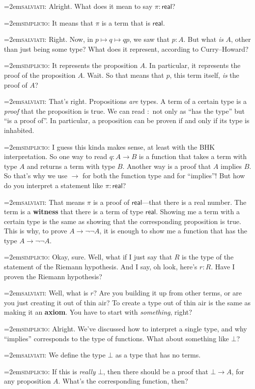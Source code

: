 \documentclass[11pt,paper=letter]{scrartcl}
\renewcommand{\sf}{\mathsf}
\renewcommand{\lnot}{\neg}
\newcommand{\false}{\bot}
\newcommand{\simp}{\vspace{0.5em}\noindent\hangindent=2em\textsc{simplicio:} }
\newcommand{\salv}{\vspace{0.5em}\noindent\hangindent=2em\textsc{salviati:} }
\begin{document}
\salv Alright. What does it mean to say $\pi : \sf{real}$?

\simp It means that $\pi$ is a term that is $\sf{real}$.

\salv Right. Now, in $p \mapsto q \mapsto qp$, we saw that $p : A$. But what \emph{is} $A$, other than just being some type? What does it represent, according to Curry--Howard?

\simp It represents the proposition $A$. In particular, it represents the proof of the proposition $A$. Wait. So that means that $p$, this term itself, \emph{is} the proof of $A$?

\salv That's right. Propositions \emph{are} types. A term of a certain type is a \emph{proof} that the proposition is true. We can read $:$ not only as ``has the type'' but ``is a proof of''. In particular, a proposition can be proven if and only if its type is inhabited.

\simp I guess this kinda makes sense, at least with the BHK interpretation. So one way to read $q : A \to B$ is a function that takes a term with type $A$ and returns a term with type $B$. Another way is a proof that $A$ implies $B$. So that's why we use $\to$ for both the function type and for ``implies''! But how do you interpret a statement like $\pi : \sf{real}$?

\salv That means $\pi$ is a proof of $\sf{real}$---that there is a real number. The term is a \textbf{witness} that there is a term of type $\sf{real}$. Showing me a term with a certain type is the same as showing that the corresponding proposition is true. This is why, to prove $A \to \lnot\lnot A$, it is enough to show me a function that has the type $A \to \lnot\lnot A$.

\simp Okay, sure. Well, what if I just say that $R$ is the type of the statement of the Riemann hypothesis. And I say, oh look, here's $r : R$. Have I proven the Riemann hypothesis?

\salv Well, what is $r$? Are you building it up from other terms, or are you just creating it out of thin air? To create a type out of thin air is the same as making it an \textbf{axiom}. You have to start with \emph{something}, right?

\simp Alright. We've discussed how to interpret a single type, and why ``implies'' corresponds to the type of functions. What about something like $\false$?

\salv We define the type $\false$ as a type that has no terms.

\simp If this is \emph{really} $\false$, then there should be a proof that $\false \to A$, for any proposition $A$. What's the corresponding function, then?
\end{document}
